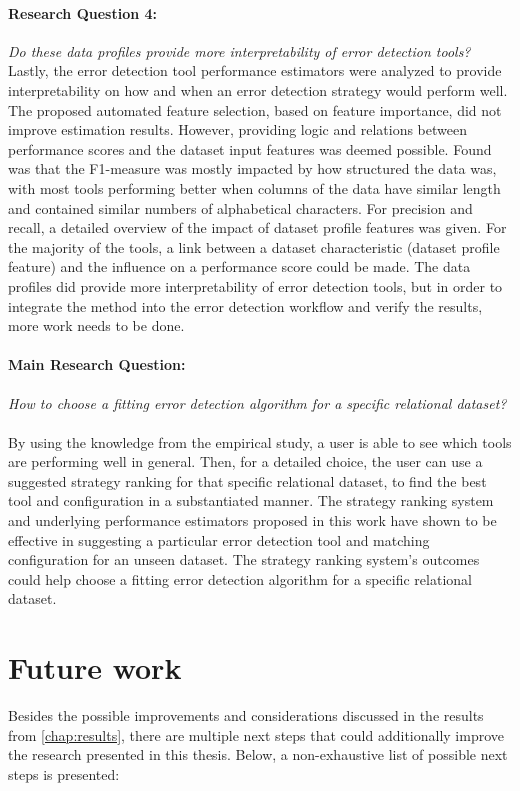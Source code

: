 \paragraph{Research Question 4:} \textit{Do these data profiles provide more interpretability of error detection tools?}
~\\Lastly, the error detection tool performance estimators were analyzed to provide interpretability on how and when an error detection strategy would perform well. The proposed automated feature selection, based on feature importance, did not improve estimation results. However, providing logic and relations between performance scores and the dataset input features was deemed possible. Found was that the F1-measure was mostly impacted by how structured the data was, with most tools performing better when columns of the data have similar length and contained similar numbers of alphabetical characters. For precision and recall, a detailed overview of the impact of dataset profile features was given. For the majority of the tools, a link between a dataset characteristic (dataset profile feature) and the influence on a performance score could be made. The data profiles did provide more interpretability of error detection tools, but in order to integrate the method into the error detection workflow and verify the results, more work needs to be done. 

\paragraph{Main Research Question:} \textit{How to choose a fitting error detection algorithm for a specific relational dataset?}
~\\By using the knowledge from the empirical study, a user is able to see which tools are performing well in general. Then, for a detailed choice, the user can use a suggested strategy ranking for that specific relational dataset, to find the best tool and configuration in a substantiated manner. The strategy ranking system and underlying performance estimators proposed in this work have shown to be effective in suggesting a particular error detection tool and matching configuration for an unseen dataset. The strategy ranking system's outcomes could help choose a fitting error detection algorithm for a specific relational dataset.

\section*{Future work}
Besides the possible improvements and considerations discussed in the results from \autoref{chap:results}, there are multiple next steps that could additionally improve the research presented in this thesis. Below, a non-exhaustive list of possible next steps is presented:


